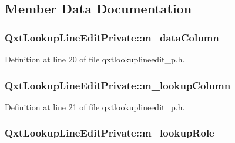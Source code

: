 \subsection{Member Data Documentation}
\hypertarget{class_qxt_lookup_line_edit_private_a8f3d2020f0174d0c732bd374176f4270}{
\subsubsection[{m\-\_\-data\-Column}]{ Qxt\-Lookup\-Line\-Edit\-Private\-::m\-\_\-data\-Column}}\label{class_qxt_lookup_line_edit_private_a8f3d2020f0174d0c732bd374176f4270}


Definition at line 20 of file qxtlookuplineedit\-\_\-p.\-h.

\hypertarget{class_qxt_lookup_line_edit_private_a471dc1e7fedca313523ff16c57f73b8d}{
\subsubsection[{m\-\_\-lookup\-Column}]{ Qxt\-Lookup\-Line\-Edit\-Private\-::m\-\_\-lookup\-Column}}\label{class_qxt_lookup_line_edit_private_a471dc1e7fedca313523ff16c57f73b8d}


Definition at line 21 of file qxtlookuplineedit\-\_\-p.\-h.

\hypertarget{class_qxt_lookup_line_edit_private_a92a15c613bed15999fd0777de6b82b26}{
\subsubsection[{m\-\_\-lookup\-Role}]{ Qxt\-Lookup\-Line\-Edit\-Private\-::m\-\_\-lookup\-Role}}\label{class_qxt_lookup_line_edit_private_a92a15c613bed15999fd0777de6b82b26}


